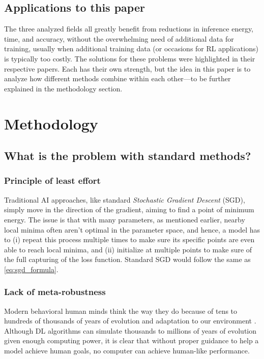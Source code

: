 \documentclass[conference]{IEEEtran}
\begin{document}
\subsection{Applications to this paper}
The three analyzed fields all greatly benefit from reductions in inference energy, time, and accuracy, without the overwhelming need of additional data for training, usually when additional training data (or occasions for RL applications) is typically too costly.
The solutions for these problems were highlighted in their respective papers. Each has their own strength, but the idea in this paper is to analyze how different methods combine within each other—to be further explained in the methodology section.

\section{Methodology} \label{methodology}

\subsection{What is the problem with standard methods?}

\subsubsection{Principle of least effort}
Traditional AI approaches, like standard \textit{Stochastic Gradient Descent} (SGD), simply move in the direction of the gradient, aiming to find a point of minimum energy. The issue is that with many parameters, as mentioned earlier, nearby local minima often aren't optimal in the parameter space, and hence, a model has to (i) repeat this process multiple times to make sure its specific points are even able to reach local minima, and (ii) initialize at multiple points to make sure of the full capturing of the loss function. Standard SGD would follow the same as \eqref{eq:sgd_formula}.

\subsubsection{Lack of meta-robustness}
Modern behavioral human minds think the way they do because of tens to hundreds of thousands of years of evolution and adaptation to our environment \cite{behavioral2007}. Although DL algorithms can simulate thousands to millions of years of evolution given enough computing power, it is clear that without proper guidance to help a model achieve human goals, no computer can achieve human-like performance. 
\end{document}
